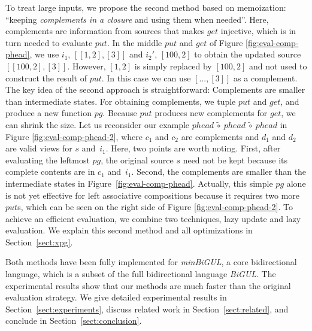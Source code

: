 To treat large inputs, we propose the second method based on memoization: ``keeping \emph{complements in a closure} and using them when needed''.
Here, complements are information from sources that makes $get$ injective, which is in turn needed to evaluate $put$.
  In the middle $put$ and $get$ of Figure \ref{fig:eval-comp-phead},
  we use $i_1$, $[[1,2],[3]]$ and $i_2'$, $[100,2]$ to obtain the updated source $[[100,2],[3]]$. However, $[1,2]$ is simply replaced by $[100,2]$ and not used to construct the result of $put$. In this case we can use $[..., [3]]$ as a complement.
The key idea of the second approach is straightforward: Complements are smaller
than
intermediate states.
%
%
For obtaining complements, we tuple $put$ and $get$, and produce a new function $pg$. Because $put$ produces new complements for $get$, we can shrink the size.
Let us reconsider our example $phead~\tilde{\circ}~phead~\tilde{\circ}~phead$ in Figure \ref{fig:eval-comp-phead-2}, where $c_1$ and $c_2$ are complements and $d_1$ and $d_2$ are valid views for $s$ and~$i_1$. Here, two points are worth noting. First, after evaluating the leftmost $pg$, the original source $s$ need not be kept because its complete contents are in $c_1$ and~$i_1$. Second, the complements are smaller than the intermediate states in Figure~\ref{fig:eval-comp-phead}.
Actually, this simple
$pg$ alone is not yet effective for left associative compositions because it requires two more $put$s, which can be seen on the right side of Figure \ref{fig:eval-comp-phead-2}. To achieve an efficient evaluation, we combine two techniques, lazy update and lazy evaluation. We explain this second method and all optimizations in Section~\ref{sect:xpg}.

Both methods have been fully implemented for \emph{minBiGUL}, a core bidirectional language, which is a subset of the full bidirectional language \emph{BiGUL}. The experimental results show that our methods are much faster than the original evaluation strategy.
We give detailed experimental results in Section~\ref{sect:experiments}, discuss related work in Section~\ref{sect:related}, and conclude in Section~\ref{sect:conclusion}.

